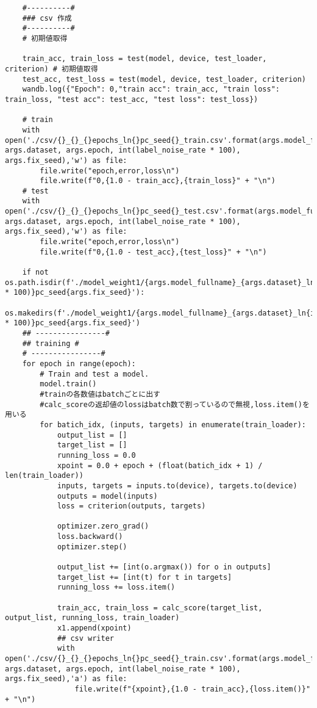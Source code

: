{\begin{verbatim}
    #----------#
    ### csv 作成
    #----------#
    # 初期値取得
    
    train_acc, train_loss = test(model, device, test_loader, criterion) # 初期値取得
    test_acc, test_loss = test(model, device, test_loader, criterion)
    wandb.log({"Epoch": 0,"train acc": train_acc, "train loss": train_loss, "test acc": test_acc, "test loss": test_loss})

    # train
    with open('./csv/{}_{}_{}epochs_ln{}pc_seed{}_train.csv'.format(args.model_fullname, args.dataset, args.epoch, int(label_noise_rate * 100), args.fix_seed),'w') as file:
        file.write("epoch,error,loss\n")
        file.write(f"0,{1.0 - train_acc},{train_loss}" + "\n")
    # test
    with open('./csv/{}_{}_{}epochs_ln{}pc_seed{}_test.csv'.format(args.model_fullname, args.dataset, args.epoch, int(label_noise_rate * 100), args.fix_seed),'w') as file:
        file.write("epoch,error,loss\n")
        file.write(f"0,{1.0 - test_acc},{test_loss}" + "\n")

    if not os.path.isdir(f'./model_weight1/{args.model_fullname}_{args.dataset}_ln{int(label_noise_rate * 100)}pc_seed{args.fix_seed}'):
        os.makedirs(f'./model_weight1/{args.model_fullname}_{args.dataset}_ln{int(label_noise_rate * 100)}pc_seed{args.fix_seed}')
    ## ----------------#
    ## training #
    # ----------------#
    for epoch in range(epoch):
        # Train and test a model.
        model.train()
        #trainの各数値はbatchごとに出す
        #calc_scoreの返却値のlossはbatch数で割っているので無視,loss.item()を用いる
        for batich_idx, (inputs, targets) in enumerate(train_loader):
            output_list = []
            target_list = []
            running_loss = 0.0
            xpoint = 0.0 + epoch + (float(batich_idx + 1) / len(train_loader))
            inputs, targets = inputs.to(device), targets.to(device)
            outputs = model(inputs)
            loss = criterion(outputs, targets)

            optimizer.zero_grad()
            loss.backward()
            optimizer.step()

            output_list += [int(o.argmax()) for o in outputs]
            target_list += [int(t) for t in targets]
            running_loss += loss.item()

            train_acc, train_loss = calc_score(target_list, output_list, running_loss, train_loader)
            x1.append(xpoint)
            ## csv writer
            with open('./csv/{}_{}_{}epochs_ln{}pc_seed{}_train.csv'.format(args.model_fullname, args.dataset, args.epoch, int(label_noise_rate * 100), args.fix_seed),'a') as file:
                file.write(f"{xpoint},{1.0 - train_acc},{loss.item()}" + "\n")
            

\end{verbatim}}
